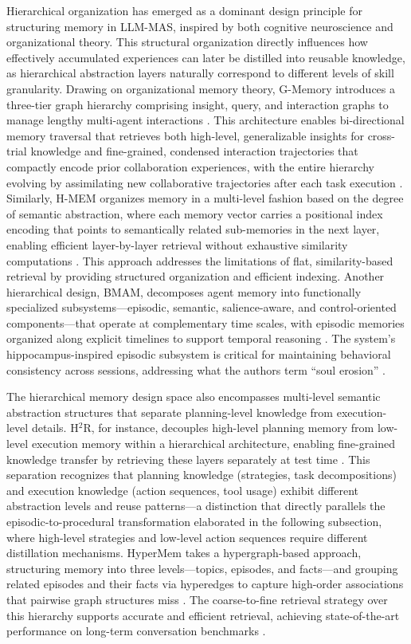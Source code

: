 \documentclass[11pt]{article}
\begin{document}
Hierarchical organization has emerged as a dominant design principle for structuring memory in LLM-MAS, inspired by both cognitive neuroscience and organizational theory. This structural organization directly influences how effectively accumulated experiences can later be distilled into reusable knowledge, as hierarchical abstraction layers naturally correspond to different levels of skill granularity. Drawing on organizational memory theory, G-Memory introduces a three-tier graph hierarchy comprising insight, query, and interaction graphs to manage lengthy multi-agent interactions \cite{ref118}. This architecture enables bi-directional memory traversal that retrieves both high-level, generalizable insights for cross-trial knowledge and fine-grained, condensed interaction trajectories that compactly encode prior collaboration experiences, with the entire hierarchy evolving by assimilating new collaborative trajectories after each task execution \cite{ref118}. Similarly, H-MEM organizes memory in a multi-level fashion based on the degree of semantic abstraction, where each memory vector carries a positional index encoding that points to semantically related sub-memories in the next layer, enabling efficient layer-by-layer retrieval without exhaustive similarity computations \cite{ref119}. This approach addresses the limitations of flat, similarity-based retrieval by providing structured organization and efficient indexing. Another hierarchical design, BMAM, decomposes agent memory into functionally specialized subsystems---episodic, semantic, salience-aware, and control-oriented components---that operate at complementary time scales, with episodic memories organized along explicit timelines to support temporal reasoning \cite{ref120}. The system's hippocampus-inspired episodic subsystem is critical for maintaining behavioral consistency across sessions, addressing what the authors term ``soul erosion'' \cite{ref120}.

The hierarchical memory design space also encompasses multi-level semantic abstraction structures that separate planning-level knowledge from execution-level details. H\(^2\)R, for instance, decouples high-level planning memory from low-level execution memory within a hierarchical architecture, enabling fine-grained knowledge transfer by retrieving these layers separately at test time \cite{ref121}. This separation recognizes that planning knowledge (strategies, task decompositions) and execution knowledge (action sequences, tool usage) exhibit different abstraction levels and reuse patterns---a distinction that directly parallels the episodic-to-procedural transformation elaborated in the following subsection, where high-level strategies and low-level action sequences require different distillation mechanisms. HyperMem takes a hypergraph-based approach, structuring memory into three levels---topics, episodes, and facts---and grouping related episodes and their facts via hyperedges to capture high-order associations that pairwise graph structures miss \cite{ref122}. The coarse-to-fine retrieval strategy over this hierarchy supports accurate and efficient retrieval, achieving state-of-the-art performance on long-term conversation benchmarks \cite{ref122}.
\end{document}
